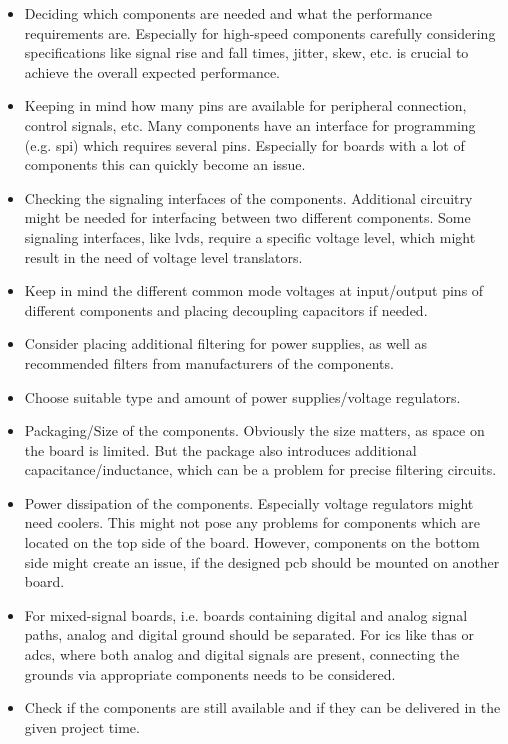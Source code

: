 \begin{itemize}
	\item Deciding which components are needed and what the performance requirements are. Especially for high-speed components carefully considering specifications like signal rise and fall times, jitter, skew, etc. is crucial to achieve the overall expected performance.
	\item Keeping in mind how many pins are available for peripheral connection, control signals, etc. Many components have an interface for programming (e.g. \gls{spi}) which requires several pins. Especially for boards with a lot of components this can quickly become an issue.
	\item Checking the signaling interfaces of the components. Additional circuitry might be needed for interfacing between two different components. Some signaling interfaces, like \gls{lvds}, require a specific voltage level, which might result in the need of voltage level translators.
	\item Keep in mind the different common mode voltages at input/output pins of different components and placing decoupling capacitors if needed.
	\item Consider placing additional filtering for power supplies, as well as recommended filters from manufacturers of the components. 
	\item Choose suitable type and amount of power supplies/voltage regulators.
	\item Packaging/Size of the components. Obviously the size matters, as space on the board is limited. But the package also introduces additional capacitance/inductance, which can be a problem for precise filtering circuits. 
	\item Power dissipation of the components. Especially voltage regulators might need coolers. This might not pose any problems for components which are located on the top side of the board. However, components on the bottom side might create an issue, if the designed \gls{pcb} should be mounted on another board.
	\item For mixed-signal boards, i.e. boards containing digital and analog signal paths, analog and digital ground should be separated. For \glspl{ic} like \glspl{tha} or \glspl{adc}, where both analog and digital signals are present, connecting the grounds via appropriate components needs to be considered.
	\item Check if the components are still available and if they can be delivered in the given project time.
\end{itemize}  

